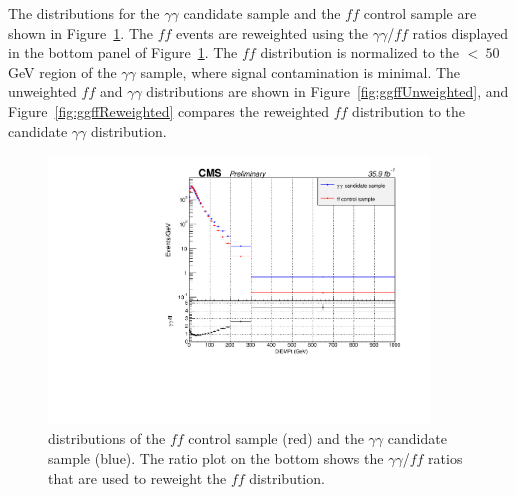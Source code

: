 The \diempt distributions for the $\gamma\gamma$ candidate sample and the $ff$ control sample are shown in Figure~\ref{fig:ggffDiempt}. The $ff$ events are reweighted using the $\gamma\gamma$/$ff$ ratios displayed in the bottom panel of Figure~\ref{fig:ggffDiempt}. The $ff$ \ETmiss distribution is normalized to the \ETmiss $<~50$ GeV region of the $\gamma\gamma$ sample, where signal contamination is minimal. The unweighted $ff$ and $\gamma\gamma$ \ETmiss distributions are shown in Figure~\ref{fig:ggffUnweighted}, and Figure~\ref{fig:ggffReweighted} compares the reweighted $ff$ \ETmiss distribution to the candidate $\gamma\gamma$ \ETmiss distribution.

\begin{figure}[h]
\begin{center}
\includegraphics[width=0.9\textwidth]{Figures/DataAnalysis/ggffDiempt.pdf}
\end{center}
\caption[\Diempt distributions of the $ff$ control sample and the $\gamma\gamma$ candidate sample.]
{\Diempt distributions of the $ff$ control sample (red) and the $\gamma\gamma$ candidate sample (blue). The ratio plot on the bottom shows the $\gamma\gamma$/$ff$ ratios that are used to reweight the $ff$ \ETmiss distribution. }
\label{fig:ggffDiempt}
\end{figure}


